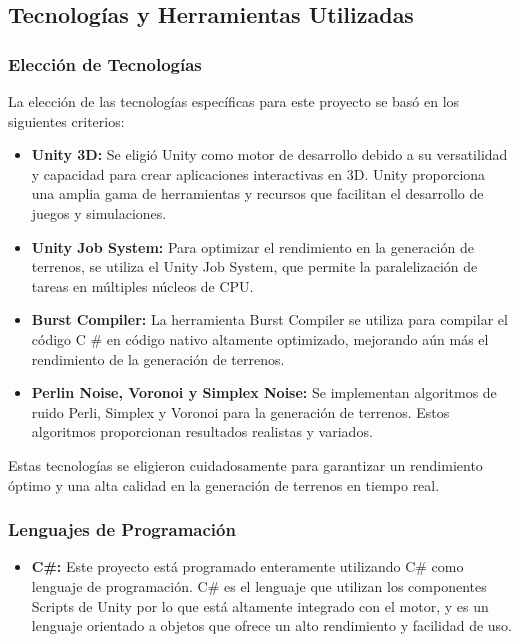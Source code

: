 \subsection{Tecnologías y Herramientas Utilizadas}

\subsubsection{Elección de Tecnologías}
La elección de las tecnologías específicas para este proyecto se basó en los siguientes criterios:

\begin{itemize}
    \item \textbf{Unity 3D:} Se eligió Unity como motor de desarrollo debido a su versatilidad y capacidad para crear aplicaciones interactivas en 3D. Unity proporciona una amplia gama de herramientas y recursos que facilitan el desarrollo de juegos y simulaciones.
    
    \item \textbf{Unity Job System:} Para optimizar el rendimiento en la generación de terrenos, se utiliza el Unity Job System, que permite la paralelización de tareas en múltiples núcleos de CPU.
    
    \item \textbf{Burst Compiler:} La herramienta Burst Compiler se utiliza para compilar el código C \# en código nativo altamente optimizado, mejorando aún más el rendimiento de la generación de terrenos.
    
    \item \textbf{Perlin Noise, Voronoi y Simplex Noise:} Se implementan algoritmos de ruido Perli, Simplex y Voronoi para la generación de terrenos. Estos algoritmos proporcionan resultados realistas y variados.
    
\end{itemize}

Estas tecnologías se eligieron cuidadosamente para garantizar un rendimiento óptimo y una alta calidad en la generación de terrenos en tiempo real.

\subsubsection{Lenguajes de Programación}
\begin{itemize}
    \item \textbf{C\#:} Este proyecto está programado enteramente utilizando C\# como lenguaje de programación. C\# es el lenguaje que utilizan los componentes Scripts de Unity por lo que está altamente integrado con el motor, y es un lenguaje orientado a objetos que ofrece un alto rendimiento y facilidad de uso.
    
\end{itemize}

